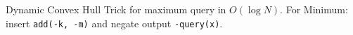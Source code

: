 
Dynamic Convex Hull Trick for maximum query in $O(\log N)$. For Minimum: insert \lstinline|add(-k, -m)| and negate output \lstinline|-query(x)|.


